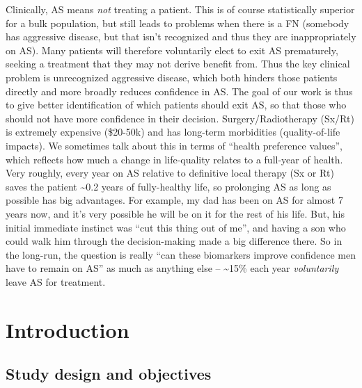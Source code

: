 \documentclass[]{article}
\begin{document}
Clinically, AS means \emph{not} treating a patient. This is of course statistically superior for a bulk population, but still leads to problems when there is a FN (somebody has aggressive disease, but that isn't recognized and thus they are inappropriately on AS). Many patients will therefore voluntarily elect to exit AS prematurely, seeking a treatment that they may not derive benefit from. Thus the key clinical problem is unrecognized aggressive disease, which both hinders those patients directly and more broadly reduces confidence in AS. The goal of our work is thus to give better identification of which patients should exit AS, so that those who should not have more confidence in their decision. Surgery/Radiotherapy (Sx/Rt) is extremely expensive (\$20-50k) and has long-term morbidities (quality-of-life impacts). We sometimes talk about this in terms of \enquote{health preference values}, which reflects how much a change in life-quality relates to a full-year of health. Very roughly, every year on AS relative to definitive local therapy (Sx or Rt) saves the patient \textasciitilde{}0.2 years of fully-healthy life, so prolonging AS as long as possible has big advantages. For example, my dad has been on AS for almost 7 years now, and it's very possible he will be on it for the rest of his life. But, his initial immediate instinct was \enquote{cut this thing out of me}, and having a son who could walk him through the decision-making made a big difference there. So in the long-run, the question is really \enquote{can these biomarkers improve confidence men have to remain on AS} as much as anything else -- \textasciitilde{}15\% each year \emph{voluntarily} leave AS for treatment.

\hypertarget{introduction}{%
\section{Introduction}\label{introduction}}

\hypertarget{study-design-and-objectives}{%
\subsection{Study design and objectives}\label{study-design-and-objectives}}
\end{document}
